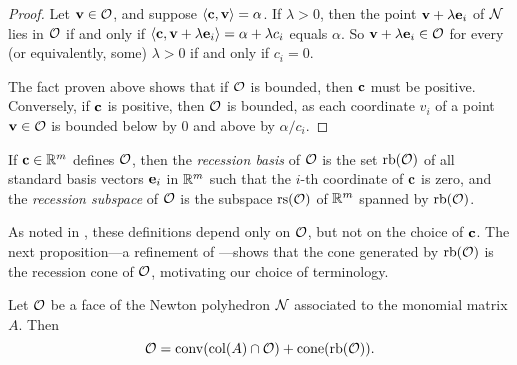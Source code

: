 \documentclass[11pt]{amsart}
\begin{document}
\begin{proof}
   Let $\mathbf{v} \in \mathcal{O}$, and suppose $\langle \mathbf{c}, \mathbf{v} \rangle = \alpha$.
   If $\lambda > 0$, then the point $\mathbf{v} + \lambda \mathbf{e}_i$ of $\mathcal{N}$ lies in $\mathcal{O}$ if and only if $\langle \mathbf{c}, \mathbf{v} + \lambda \mathbf{e}_i \rangle = \alpha + \lambda c_i$ equals $\alpha$.
   So $\mathbf{v} + \lambda \mathbf{e}_i \in \mathcal{O}$ for every (or equivalently, some) $\lambda > 0$ if and only if $c_i = 0$. 

   The fact proven above shows that if $\mathcal{O}$ is bounded, then $\mathbf{c}$ must be positive.
   Conversely, if $\mathbf{c}$ is positive, then $\mathcal{O}$ is bounded, as each coordinate $v_i$ of a point $\mathbf{v}\in \mathcal{O}$ is bounded below by 0 and above by $\alpha/c_i$. 
\end{proof}

\begin{definition}
   If $\mathbf{c} \in \mathbb{R}^m$ defines $\mathcal{O}$, then the \emph{recession basis} of $\mathcal{O}$ is the set $\operatorname{rb}(\mathcal{O})$ of all standard basis vectors $\mathbf{e}_i$ in $\mathbb{R}^m$ such that the $i$-th coordinate of $\mathbf{c}$ is zero, and the \emph{recession subspace} of $\mathcal{O}$ is the subspace $\operatorname{rs}(\mathcal{O})$ of $\mathbb{R}^m$ spanned by $\operatorname{rb}(\mathcal{O})$.
\end{definition}

As noted in , these definitions depend only on $\mathcal{O}$, but not on the choice of $\mathbf{c}$.
The next proposition---a refinement of ---shows that the cone generated by $\operatorname{rb}(\mathcal{O})$ is the recession cone of $\mathcal{O}$, motivating our choice of terminology.

\begin{proposition}
   Let $\mathcal{O}$ be a face of the Newton polyhedron $\mathcal{N}$ associated to the monomial matrix $A$.
   Then
   \begin{equation}\label{face: e}
      \mathcal{O} =  \operatorname{conv}( \operatorname{col}(A) \cap \mathcal{O} ) + \operatorname{cone}(\operatorname{rb}(\mathcal{O})).
   \end{equation}
\end{proposition}

\end{document}
